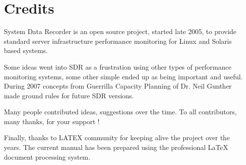 
\chapter*{Credits}

\noindent
System Data Recorder is an open source project, started late 2005,
to provide standard server infrastructure performance monitoring for 
Linux and Solaris based systems.

\noindent
\newline
Some ideas went into SDR as a frustration using other types of performance 
monitoring systems, some other simple ended up as being important and useful. 
During 2007 concepts from Guerrilla Capacity Planning of Dr. Neil Gunther made 
ground rules for future SDR versions.

\noindent
Many people contributed ideas, suggestions over the time. To all contributors, 
many thanks, for your support !

\noindent
\newline
Finally, thanks to LATEX community for keeping alive the project over the years.
The current manual has been prepared using the professional \LaTeX{} document 
processing system.

\endinput
